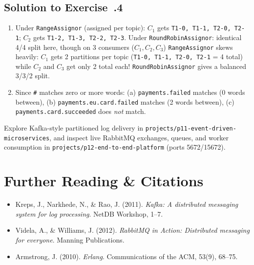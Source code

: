 \subsection*{Solution to Exercise~\thechapter.4}
\begin{enumerate}[leftmargin=18pt]
  \item Under \texttt{RangeAssignor} (assigned per topic): $C_1$ gets \texttt{T1-0, T1-1, T2-0, T2-1}; $C_2$ gets \texttt{T1-2, T1-3, T2-2, T2-3}. Under \texttt{RoundRobinAssignor}: identical 4/4 split here, though on 3 consumers ($C_1, C_2, C_3$) \texttt{RangeAssignor} skews heavily: $C_1$ gets 2 partitions per topic (\texttt{T1-0, T1-1, T2-0, T2-1} = 4 total) while $C_2$ and $C_3$ get only 2 total each! \texttt{RoundRobinAssignor} gives a balanced 3/3/2 split.
  \item Since \texttt{\#} matches zero or more words: (a) \texttt{payments.failed} matches (0 words between), (b) \texttt{payments.eu.card.failed} matches (2 words between), (c) \texttt{payments.card.succeeded} does \emph{not} match.
\end{enumerate}

\begin{labbridgebox}
Explore Kafka-style partitioned log delivery in \texttt{projects/p11-event-driven-microservices}, and inspect live RabbitMQ exchanges, queues, and worker consumption in \texttt{projects/p12-end-to-end-platform} (ports 5672/15672).
\end{labbridgebox}

\section{Further Reading \protect\& Citations}
\begin{itemize}[leftmargin=18pt]
  \item Kreps, J., Narkhede, N., \& Rao, J. (2011). \emph{Kafka: A distributed messaging system for log processing}. NetDB Workshop, 1--7.
  \item Videla, A., \& Williams, J. (2012). \emph{RabbitMQ in Action: Distributed messaging for everyone}. Manning Publications.
  \item Armstrong, J. (2010). \emph{Erlang}. Communications of the ACM, 53(9), 68--75.
\end{itemize}
